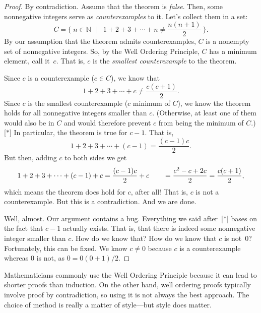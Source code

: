 \begin{proof}
By contradiction. Assume that the theorem is
\emph{false}. Then, some nonnegative integers serve as
\emph{counterexamples} to it. Let's collect them in a set: 
$$
C =     \bigl\{\: 
        n\in\mathbb{N} 
        \:\:\mid\:\:
        1 + 2 + 3 + \cdots + n \neq \frac{n(n+1)}{2}
        \:\bigr\}.
$$
By our assumption that the theorem admits counterexamples, $C$ is a
nonempty set of nonnegative integers. So, by the Well Ordering Principle,
$C$ has a minimum element, call it~$c$. That is, $c$ is the
\emph{smallest counterexample} to the theorem.  

\noindent
Since $c$ is a counterexample ($c\in C$), we know that 
$$
        1 + 2 + 3 + \cdots + c \neq \frac{c(c+1)}{2}.
$$
Since $c$ is the smallest counterexample ($c$ minimum of $C$), we
know the theorem holds for all nonnegative integers smaller than
$c$. (Otherwise, at least one of them would also be in $C$ and would
therefore prevent $c$ from being the minimum of $C$.) [$\ast$] In
particular, the theorem is true for $c-1$. That is, 
$$
        1 + 2 + 3 + \cdots + (c-1) = \frac{(c-1)c}{2}.
$$
But then, adding $c$ to both sides we get
$$
1 + 2 + 3 + \cdots + (c-1) + c 
        = \frac{(c-1)c}{2} + c \\\qquad
        = \frac{c^2 - c + 2c}{2} \\
        = \frac{c(c+1)}{2},
$$
which means the theorem does hold for $c$, after all! That is, $c$ is
not a counterexample. But this is a contradiction. And we are done.

\noindent
Well, almost. Our argument contains a bug. Everything we said
after~[$\ast$] bases on the fact that $c-1$ actually exists. That is,
that there is indeed some nonnegative integer smaller than $c$. How do we
know that? How do we know that $c$ is not~0? Fortunately, this can be
fixed. We know $c\neq 0$ because $c$ is a counterexample whereas $0$
is not, as $0=0(0+1)/2$.
\end{proof}
\fi

Mathematicians commonly use the Well Ordering Principle because it can
lead to shorter proofs than induction.  On the other hand, well ordering
proofs typically involve proof by contradiction, so using it is not always
the best approach.  The choice of method is really a matter of style---but
style does matter.

\endinput